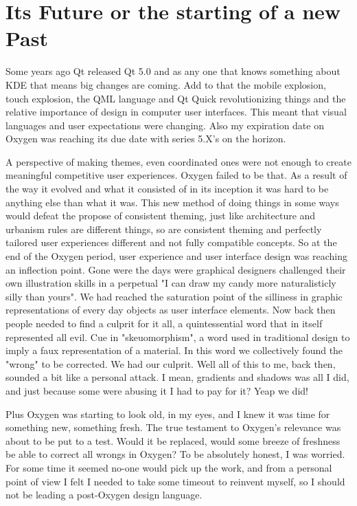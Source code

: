 \section*{Its Future or the starting of a new Past}
Some years ago Qt released Qt 5.0 and as any one that knows something about KDE that means big changes are coming. Add to that the mobile explosion, touch explosion, the QML language and Qt Quick revolutionizing things and the relative importance of design in computer user interfaces.
This meant that visual languages and user expectations were changing. Also my expiration date on Oxygen was reaching its due date with series 5.X's on the horizon.

A perspective of making themes, even coordinated ones were not enough to create meaningful competitive user experiences.        
Oxygen failed to be that. As a result of the way it evolved and what it consisted of in its inception it was hard to be anything else than what it was. This new method of doing things in some ways would defeat the propose of consistent theming, just like architecture and urbanism rules are different things, so are consistent theming and perfectly tailored user experiences different and not fully compatible concepts.    
So at the end of the Oxygen period, user experience and user interface design was reaching an inflection point. Gone were the days were graphical designers challenged their own illustration skills in a perpetual "I can draw my candy more naturalisticly silly than yours".
We had reached the saturation point of the silliness in graphic representations of every day objects as user interface elements. Now back then people needed to find a culprit for it all, a quintessential word that in itself represented all evil. Cue in "skeuomorphism", a word used in traditional design to imply a faux representation of a material. In this word we collectively found the "wrong" to be corrected. We had our culprit.
Well all of this to me, back then, sounded a bit like a personal attack. I mean, gradients and shadows was all I did, and just because some were abusing it I had to pay for it? Yeap we did!

Plus Oxygen was starting to look old, in my eyes, and I knew it was time for something new, something fresh. 
The true testament to Oxygen's relevance was about to be put to a test. Would it be replaced, would some breeze of freshness be able to correct all wrongs in Oxygen?
To be absolutely honest, I was worried. For some time it seemed no-one would pick up the work, and from a personal point of view I felt I needed to take some timeout to reinvent myself, so I should not be leading a post-Oxygen design language.


